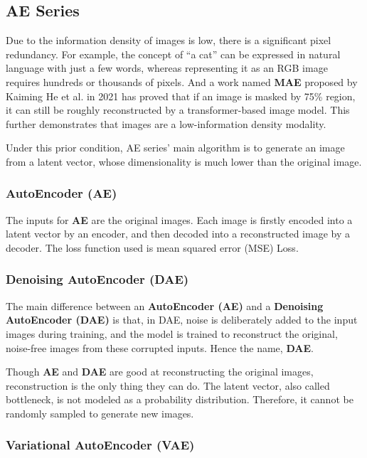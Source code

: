 \documentclass{article}
\begin{document}
\subsection{AE Series}

Due to the information density of images is low, there is a significant pixel redundancy. For example, the 
concept of ``a cat'' can be expressed in natural language with just a few words, whereas representing it as 
an RGB image requires hundreds or thousands of pixels. And a work named \textbf{MAE} proposed by Kaiming He 
et al. in 2021 has proved that if an image is masked by 75\% region, it can still be roughly reconstructed 
by a transformer-based image model. This further demonstrates that images are a low-information density 
modality.

Under this prior condition, AE series' main algorithm is to generate an image from a latent vector, whose 
dimensionality is much lower than the original image.

\subsubsection{AutoEncoder (AE)}

The inputs for \textbf{AE} are the original images. Each image is firstly encoded into a latent vector by an 
encoder, and then decoded into a reconstructed image by a decoder. The loss function used is mean squared 
error (MSE) Loss.

\subsubsection{Denoising AutoEncoder (DAE)}

The main difference between an \textbf{AutoEncoder (AE)} and a \textbf{Denoising AutoEncoder (DAE)} is that, 
in DAE, noise is deliberately added to the input images during training, and the model is trained to 
reconstruct the original, noise-free images from these corrupted inputs. Hence the name, \textbf{DAE}.

Though \textbf{AE} and \textbf{DAE} are good at reconstructing the original images, reconstruction is the 
only thing they can do. The latent vector, also called bottleneck, is not modeled as a probability 
distribution. Therefore, it cannot be randomly sampled to generate new images.

\subsubsection{Variational AutoEncoder (VAE)}
\end{document}
